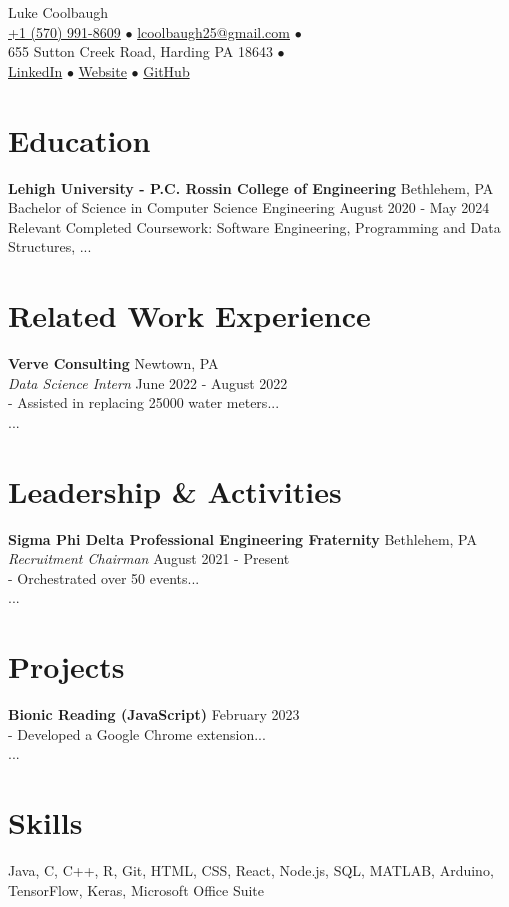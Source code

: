 \documentclass{article}
\begin{document}
\begin{center}
    {\Huge Luke Coolbaugh} \\
    \vspace{0.5cm}
    \href{tel:+15709918609}{+1 (570) 991-8609} $\bullet$
    \href{mailto:lcoolbaugh25@gmail.com}{lcoolbaugh25@gmail.com} $\bullet$ \\
    655 Sutton Creek Road, Harding PA 18643 $\bullet$ \\
    \href{https://www.linkedin.com/in/luke-coolbaugh/}{LinkedIn} $\bullet$
    \href{https://www.lukecoolbaugh.com}{Website} $\bullet$
    \href{https://github.com/lukecoolbaugh7}{GitHub}
\end{center}

\section*{Education}
\textbf{Lehigh University - P.C. Rossin College of Engineering} \hfill Bethlehem, PA \\
Bachelor of Science in Computer Science Engineering \hfill August 2020 - May 2024 \\
Relevant Completed Coursework: Software Engineering, Programming and Data Structures, ...

\section*{Related Work Experience}
\textbf{Verve Consulting} \hfill Newtown, PA \\
\textit{Data Science Intern} \hfill June 2022 - August 2022 \\
- Assisted in replacing 25000 water meters... \\
...

\section*{Leadership \& Activities}
\textbf{Sigma Phi Delta Professional Engineering Fraternity} \hfill Bethlehem, PA \\
\textit{Recruitment Chairman} \hfill August 2021 - Present \\
- Orchestrated over 50 events... \\
...

\section*{Projects}
\textbf{Bionic Reading (JavaScript)} \hfill February 2023 \\
- Developed a Google Chrome extension... \\
...

\section*{Skills}
Java, C, C++, R, Git, HTML, CSS, React, Node.js, SQL, MATLAB, Arduino, TensorFlow, Keras, Microsoft Office Suite
\end{document}
